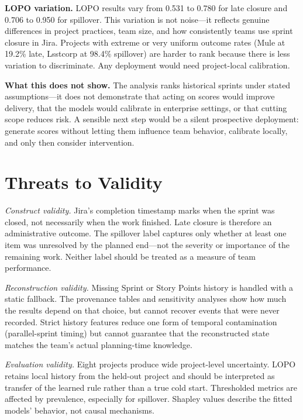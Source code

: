 \documentclass[conference]{IEEEtran}
\begin{document}
\textbf{LOPO variation.}
LOPO results vary from 0.531 to 0.780 for late closure and 0.706 to 0.950 for spillover.
This variation is not noise---it reflects genuine differences in project practices, team size, and how consistently teams use sprint closure in Jira.
Projects with extreme or very uniform outcome rates (Mule at 19.2\% late, Lsstcorp at 98.4\% spillover) are harder to rank because there is less variation to discriminate.
Any deployment would need project-local calibration.

\textbf{What this does not show.}
The analysis ranks historical sprints under stated assumptions---it does not demonstrate that acting on scores would improve delivery, that the models would calibrate in enterprise settings, or that cutting scope reduces risk.
A sensible next step would be a silent prospective deployment: generate scores without letting them influence team behavior, calibrate locally, and only then consider intervention.

\section{Threats to Validity}

\textit{Construct validity.}
Jira's completion timestamp marks when the sprint was closed, not necessarily when the work finished.
Late closure is therefore an administrative outcome.
The spillover label captures only whether at least one item was unresolved by the planned end---not the severity or importance of the remaining work.
Neither label should be treated as a measure of team performance.

\textit{Reconstruction validity.}
Missing Sprint or Story Points history is handled with a static fallback.
The provenance tables and sensitivity analyses show how much the results depend on that choice, but cannot recover events that were never recorded.
Strict history features reduce one form of temporal contamination (parallel-sprint timing) but cannot guarantee that the reconstructed state matches the team's actual planning-time knowledge.

\textit{Evaluation validity.}
Eight projects produce wide project-level uncertainty.
LOPO retains local history from the held-out project and should be interpreted as transfer of the learned rule rather than a true cold start.
Thresholded metrics are affected by prevalence, especially for spillover.
Shapley values describe the fitted models' behavior, not causal mechanisms.
\end{document}
